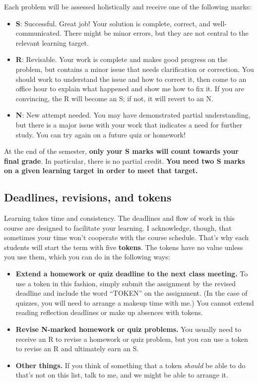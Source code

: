 \documentclass[11pt,twoside]{amsart}
\begin{document}
Each problem will be assessed holistically and receive one of the following marks:
\begin{itemize}
\item \textbf{S}: Successful. Great job! Your solution is complete, correct, and well-communicated. There might be minor errors, but they are not central to the relevant learning target.
\item \textbf{R}: Revisable. Your work is complete and makes good progress on the problem, but contains a minor issue that needs clarification or correction. You should work to understand the issue and how to correct it, then come to an office hour to explain what happened and show me how to fix it. If you are convincing, the R will become an S; if not, it will revert to an N.
\item \textbf{N}: New attempt needed. You may have demonstrated partial understanding, but there is a major issue with your work that indicates a need for further study. You can try again on a future quiz or homework!
\end{itemize}

At the end of the semester, \textbf{only your S marks will count towards your final grade}. In particular, there is no partial credit. \textbf{You need two S marks on a given learning target in order to meet that target.}

\subsection*{Deadlines, revisions, and tokens}
Learning takes time and consistency. The deadlines and flow of work in this course are designed to facilitate your learning. I acknowledge, though, that sometimes your time won't cooperate with the course schedule. That's why each students will start the term with five \textbf{tokens}. The tokens have no value unless you use them, which you can do in the following ways:
\begin{itemize}
\item \textbf{Extend a homework or quiz deadline to the next class meeting.} To use a token in this fashion, simply submit the assignment by the revised deadline and include the word ``TOKEN'' on the assignment. (In the case of quizzes, you will need to arrange a makeup time with me.) You cannot extend reading reflection deadlines or make up absences with tokens.
\item \textbf{Revise N-marked homework or quiz problems.} You usually need to receive an R to revise a homework or quiz problem, but you can use a token to revise an R and ultimately earn an S.
\item \textbf{Other things.} If you think of something that a token \emph{should} be able to do that's not on this list, talk to me, and we might be able to arrange it.
\end{itemize}
\end{document}
